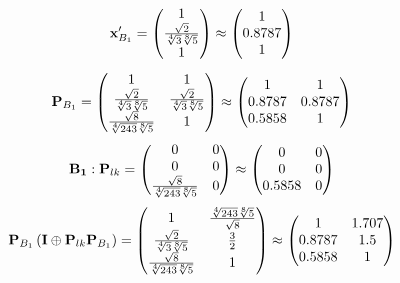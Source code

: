 \documentclass[10pt,a4paper]{article}
\begin{document}
	\[
		\bold{x}'_{B_1} = 
		\begin{pmatrix}
			{1} {} \\
			\frac{\sqrt{2}} {\sqrt[4]{3}\sqrt[8]{5}} \\
			{1} {} \\
		\end{pmatrix}
		\approx
		\begin{pmatrix}
			1        \\
			0.8787   \\
			1        \\
		\end{pmatrix}
	\]
	\[
		\bold{P}_{B_1} = 
		\begin{pmatrix}
			{1} {} & {1} {} \\
			\frac{\sqrt{2}} {\sqrt[4]{3}\sqrt[8]{5}} & \frac{\sqrt{2}} {\sqrt[4]{3}\sqrt[8]{5}} \\
			\frac{\sqrt{8}} {\sqrt[4]{243}\sqrt[8]{5}} & {1} {} \\
		\end{pmatrix}
		\approx
		\begin{pmatrix}
			1        & 1        \\
			0.8787   & 0.8787   \\
			0.5858   & 1        \\
		\end{pmatrix}
	\]
	\[
		\bold{B_1}: \bold{P}_{lk} = 
		\begin{pmatrix}
			{{0}} {} & {{0}} {} \\
			{{0}} {} & {{0}} {} \\
			\frac{\sqrt{8}} {\sqrt[4]{243}\sqrt[8]{5}} & {{0}} {} \\
		\end{pmatrix}
		\approx
		\begin{pmatrix}
			0        & 0        \\
			0        & 0        \\
			0.5858   & 0        \\
		\end{pmatrix}
	\]
	\[
		\bold{P}_{B_1}\left(\bold{I} \oplus \bold{P}_{lk}\bold{P}_{B_1}\right) = 
		\begin{pmatrix}
			{1} {} & \frac{\sqrt[4]{243}\sqrt[8]{5}} {\sqrt{8}} \\
			\frac{\sqrt{2}} {\sqrt[4]{3}\sqrt[8]{5}} & \frac{{3}} {{2}} \\
			\frac{\sqrt{8}} {\sqrt[4]{243}\sqrt[8]{5}} & {1} {} \\
		\end{pmatrix}
		\approx
		\begin{pmatrix}
			1        & 1.707    \\
			0.8787   & 1.5      \\
			0.5858   & 1        \\
		\end{pmatrix}
	\]
\end{document}
